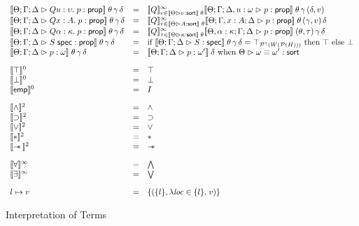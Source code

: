 \begin{figure}
\begin{displaymath}
\begin{array}{lcl}
\interp{\judgeA{Q u:\upsilon.\; p}{\assert}}\;\theta\,\gamma\,\delta & = & 
  \interp{Q}^\infty_{v \in \interp{\judgeSort{\upsilon}}\;\theta}
    \interp{\judgeA[\Theta; \Gamma; \Delta, u:\omega]{p}{\assert}}\;\theta\,\gamma\,(\delta, v) \\

\interp{\judgeA{Q x:A.\; p}{\assert}}\;\theta\,\gamma\,\delta & = & 
  \interp{Q}^\infty_{v \in \interp{\judgeSort{A}}\;\theta}
    \interp{\judgeA[\Theta; \Gamma, x:A; \Delta]{p}{\assert}}\;\theta\,(\gamma,v)\,\delta \\

\interp{\judgeA{Q \alpha:\kappa.\; p}{\assert}}\;\theta\,\gamma\,\delta & = & 
  \interp{Q}^\infty_{\tau \in \interp{\judgeSort{\kappa}}\;\theta}
    \interp{\judgeA[\Theta, \alpha:\kappa; \Gamma; \Delta]{p}{\assert}}\;(\theta, \tau)\,\gamma\,\delta \\


\interp{\judgeA{\validprop{S}}{\assert}}\;\theta\,\gamma\,\delta & = & 
   \mbox{if } \interp{\judgeS{S}}\;\theta\,\gamma\,\delta = \top_{\upset{W(\powerset{H})}}
   \mbox{ then } \top
   \mbox{ else } \bot \\

\interp{\judgeA{p}{\omega}}\;\theta\,\gamma\,\delta & = & 
   \interp{\judgeA{p}{\omega'}}\;\delta \mbox{ when } \judgeSortEq{\omega}{\omega'} \\[1em]

\interp{\top}^0 & = & \top \\
\interp{\bot}^0 & = & \bot \\
\interp{\emp}^0 & = & I \\[1em]

\interp{\land}^2    & = & \land \\
\interp{\implies}^2 & = & \implies \\
\interp{\vee}^2     & = & \vee \\
\interp{*}^2        & = & * \\
\interp{\wand}^2    & = & \wand \\[1em]

\interp{\forall}^\infty & = & \bigwedge \\
\interp{\exists}^\infty & = & \bigvee \\[1em]

l \pointsto v & = & \setof{(\setof{l}, \semfun{\mathit{loc} \in \setof{l}}{v})}
\end{array}
\end{displaymath}
\caption{ Interpretation of Terms }
\label{term-interpretation}  
\end{figure}

